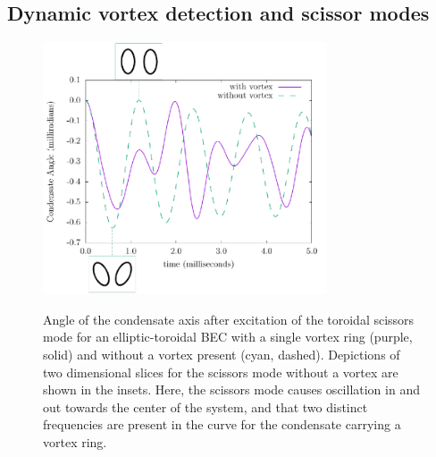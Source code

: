 \subsection{Dynamic vortex detection and scissor modes}

\begin{figure}
\center \includegraphics[width=0.75\textwidth]{data/3d/scissors_plot.pdf}
\label{fig:scissors}
\caption{\label{fig:scissors} Angle of the condensate axis after excitation of the toroidal scissors mode for an elliptic-toroidal BEC with a single vortex ring (purple, solid) and without a vortex present (cyan, dashed).
Depictions of two dimensional slices for the scissors mode without a vortex are shown in the insets.
Here, the scissors mode causes oscillation in and out towards the center of the system, and that two distinct frequencies are present in the curve for the condensate carrying a vortex ring. }
\end{figure}

